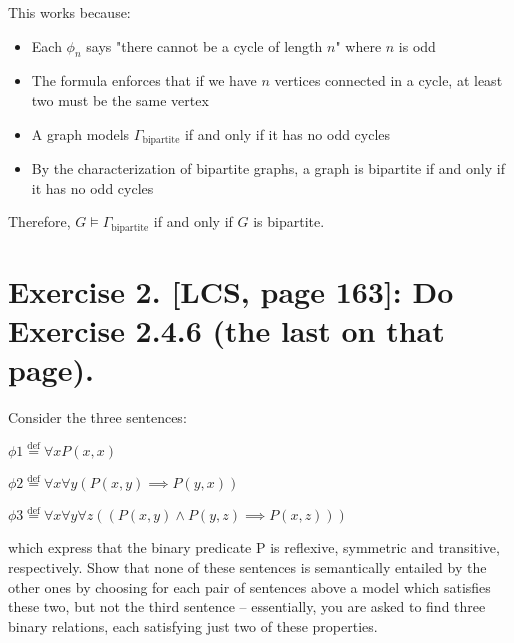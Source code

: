 \documentclass{article}
\newenvironment{proof}
{\begin{mdframed}[linewidth=0.5pt]\begin{enumerate}[label=\arabic*.,leftmargin=*]}
{\end{enumerate}\end{mdframed}}
\newcommand{\defeq}{\stackrel{\text{def}}{=}}
\begin{document}
    This works because:
\begin{proof}
    
    \begin{itemize}
        \item Each $\phi_n$ says "there cannot be a cycle of length $n$" where $n$ is odd
        \item The formula enforces that if we have $n$ vertices connected in a cycle, at least two must be the same vertex
        \item A graph models $\Gamma_{\text{bipartite}}$ if and only if it has no odd cycles
        \item By the characterization of bipartite graphs, a graph is bipartite if and only if it has no odd cycles
    \end{itemize}
    
    Therefore, $G \models \Gamma_{\text{bipartite}}$ if and only if $G$ is bipartite.
\end{proof}


\newpage



\section*{Exercise 2. [LCS, page 163]: Do Exercise 2.4.6 (the last on that page).}

\begin{mdframed}
    Consider the three sentences:
    
    \vspace{1em}
    $\phi1 \defeq \forall x P (x, x)$
    
    \vspace{1em}
    $\phi2 \defeq \forall x \forall y (P (x, y) \implies P (y, x))$
    
    \vspace{1em}
    $\phi3 \defeq \forall x \forall y \forall z ((P (x, y) \land P (y, z) \implies P (x, z)))$
    
    \vspace{1em}

    which express that the binary predicate P is reﬂexive, symmetric and transitive,
    respectively. Show that none of these sentences is semantically entailed by the
    other ones by choosing for each pair of sentences above a model which satisﬁes
    these two, but not the third sentence – essentially, you are asked to ﬁnd three
    binary relations, each satisfying just two of these properties. 
  
\end{mdframed}
\end{document}
